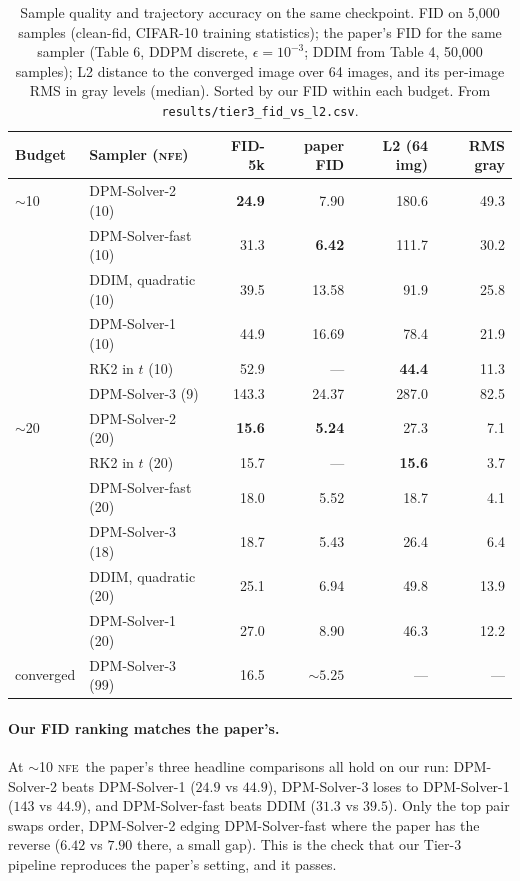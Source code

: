 \documentclass[11pt,a4paper]{article}
\newcommand{\NFE}{\textsc{nfe}}
\begin{document}
\begin{table}[t]
\centering
\caption{Sample quality and trajectory accuracy on the same checkpoint. FID on
5,000 samples (clean-fid, CIFAR-10 training statistics); the paper's FID for the
same sampler (Table 6, DDPM discrete, $\epsilon=10^{-3}$; DDIM from Table 4, 50,000
samples); L2 distance to the converged image over 64 images, and its per-image RMS
in gray levels (median). Sorted by our FID within each budget. From
\texttt{results/tier3\_fid\_vs\_l2.csv}.}
\label{tab:fid}
\small
\begin{tabular}{llrrrr}
\toprule
Budget & Sampler (\NFE) & FID-5k & paper FID & L2 (64 img) & RMS gray \\
\midrule
$\sim$10 & DPM-Solver-2 (10)     & \textbf{24.9} & 7.90  & 180.6 & 49.3 \\
         & DPM-Solver-fast (10)  & 31.3 & \textbf{6.42}  & 111.7 & 30.2 \\
         & DDIM, quadratic (10)  & 39.5 & 13.58 & 91.9  & 25.8 \\
         & DPM-Solver-1 (10)     & 44.9 & 16.69 & 78.4  & 21.9 \\
         & RK2 in $t$ (10)       & 52.9 & ---   & \textbf{44.4}  & 11.3 \\
         & DPM-Solver-3 (9)      & 143.3 & 24.37 & 287.0 & 82.5 \\
\midrule
$\sim$20 & DPM-Solver-2 (20)     & \textbf{15.6} & \textbf{5.24}  & 27.3  & 7.1 \\
         & RK2 in $t$ (20)       & 15.7 & ---   & \textbf{15.6}  & 3.7 \\
         & DPM-Solver-fast (20)  & 18.0 & 5.52  & 18.7  & 4.1 \\
         & DPM-Solver-3 (18)     & 18.7 & 5.43  & 26.4  & 6.4 \\
         & DDIM, quadratic (20)  & 25.1 & 6.94  & 49.8  & 13.9 \\
         & DPM-Solver-1 (20)     & 27.0 & 8.90  & 46.3  & 12.2 \\
\midrule
converged & DPM-Solver-3 (99)    & 16.5 & ${\sim}5.25$ & --- & --- \\
\bottomrule
\end{tabular}
\end{table}

\paragraph{Our FID ranking matches the paper's.} At $\sim$10 \NFE\ the paper's three
headline comparisons all hold on our run: DPM-Solver-2 beats DPM-Solver-1 ($24.9$ vs
$44.9$), DPM-Solver-3 loses to DPM-Solver-1 ($143$ vs $44.9$), and DPM-Solver-fast
beats DDIM ($31.3$ vs $39.5$). Only the top pair swaps order, DPM-Solver-2 edging
DPM-Solver-fast where the paper has the reverse ($6.42$ vs $7.90$ there, a small
gap). This is the check that our Tier-3 pipeline reproduces the paper's setting,
and it passes.
\end{document}
